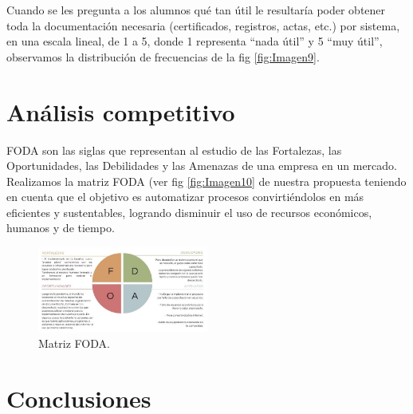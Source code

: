\documentclass[a4paper]{article}
\begin{document}
Cuando se les pregunta a los alumnos qué tan útil le resultaría poder obtener toda la documentación necesaria (certificados, registros, actas, etc.) por sistema, en una escala lineal, de 1 a 5, donde 1 representa “nada útil” y 5 “muy útil”, observamos la distribución de frecuencias de la fig \ref{fig:Imagen9}.

\section{Análisis competitivo}

FODA son las siglas que representan al estudio de las Fortalezas, las Oportunidades, las Debilidades y las Amenazas de una empresa en un mercado. 
Realizamos la matriz FODA (ver fig \ref{fig:Imagen10} de nuestra propuesta teniendo en cuenta que el objetivo es automatizar procesos convirtiéndolos en más eficientes y sustentables, logrando disminuir el uso de recursos económicos, humanos y de tiempo.

\begin{figure}
\centering
\includegraphics[width=0.5\textwidth]{Imagen10.jpg}
\caption{\label{fig:Imagen0}Matriz FODA.}
\end{figure}

\section{Conclusiones}
\end{document}

